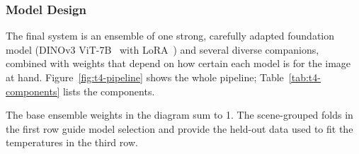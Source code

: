 \documentclass[../main.tex]{subfiles}
\begin{document}
\subsubsection{Model Design}
\label{sec:t4-design}

The final system is an ensemble of one strong, carefully adapted foundation model (DINOv3 ViT-7B~\citep{dinov3} with LoRA~\citep{lora}) and several diverse companions, combined with weights that depend on how certain each model is for the image at hand. Figure~\ref{fig:t4-pipeline} shows the whole pipeline; Table~\ref{tab:t4-components} lists the components.

The base ensemble weights in the diagram sum to 1. The scene-grouped folds in the first row guide model selection and provide the held-out data used to fit the temperatures in the third row.
\end{document}
